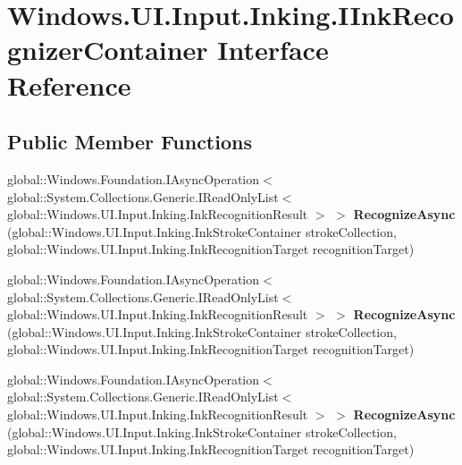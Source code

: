 \hypertarget{interface_windows_1_1_u_i_1_1_input_1_1_inking_1_1_i_ink_recognizer_container}{}\section{Windows.\+U\+I.\+Input.\+Inking.\+I\+Ink\+Recognizer\+Container Interface Reference}
\label{interface_windows_1_1_u_i_1_1_input_1_1_inking_1_1_i_ink_recognizer_container}
\subsection*{Public Member Functions}
\begin{DoxyCompactItemize}
\item 
\mbox{\label{interface_windows_1_1_u_i_1_1_input_1_1_inking_1_1_i_ink_recognizer_container_a08545c60273511304312be2fb376e96e}} 
global\+::\+Windows.\+Foundation.\+I\+Async\+Operation$<$ global\+::\+System.\+Collections.\+Generic.\+I\+Read\+Only\+List$<$ global\+::\+Windows.\+U\+I.\+Input.\+Inking.\+Ink\+Recognition\+Result $>$ $>$ {\bfseries Recognize\+Async} (global\+::\+Windows.\+U\+I.\+Input.\+Inking.\+Ink\+Stroke\+Container stroke\+Collection, global\+::\+Windows.\+U\+I.\+Input.\+Inking.\+Ink\+Recognition\+Target recognition\+Target)
\item 
\mbox{\label{interface_windows_1_1_u_i_1_1_input_1_1_inking_1_1_i_ink_recognizer_container_a08545c60273511304312be2fb376e96e}} 
global\+::\+Windows.\+Foundation.\+I\+Async\+Operation$<$ global\+::\+System.\+Collections.\+Generic.\+I\+Read\+Only\+List$<$ global\+::\+Windows.\+U\+I.\+Input.\+Inking.\+Ink\+Recognition\+Result $>$ $>$ {\bfseries Recognize\+Async} (global\+::\+Windows.\+U\+I.\+Input.\+Inking.\+Ink\+Stroke\+Container stroke\+Collection, global\+::\+Windows.\+U\+I.\+Input.\+Inking.\+Ink\+Recognition\+Target recognition\+Target)
\item 
\mbox{\label{interface_windows_1_1_u_i_1_1_input_1_1_inking_1_1_i_ink_recognizer_container_a08545c60273511304312be2fb376e96e}} 
global\+::\+Windows.\+Foundation.\+I\+Async\+Operation$<$ global\+::\+System.\+Collections.\+Generic.\+I\+Read\+Only\+List$<$ global\+::\+Windows.\+U\+I.\+Input.\+Inking.\+Ink\+Recognition\+Result $>$ $>$ {\bfseries Recognize\+Async} (global\+::\+Windows.\+U\+I.\+Input.\+Inking.\+Ink\+Stroke\+Container stroke\+Collection, global\+::\+Windows.\+U\+I.\+Input.\+Inking.\+Ink\+Recognition\+Target recognition\+Target)

\end{DoxyCompactItemize}
